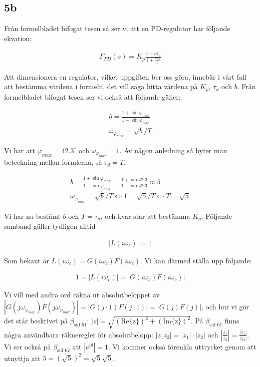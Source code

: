 \documentclass[a4paper]{article}
\newcommand{\mhb}[1]{$\beta_{\text{#1}}$}     %
\newcommand{\oklarhet}[1]{%
  \noindent\fbox{\parbox[b][2em][t]{\textwidth}{\color{red}#1} }%
}
\begin{document}
\subsection{5b}
Från formelbladet bifogat tesen så ser vi att en PD-regulator har följande ekvation:

\begin{align*}
  F_{PD}(s) = K_p \frac{1+s\tau_d}{1+\frac{s\tau_d}{b}}
\end{align*}

Att dimensionera en regulator, vilket uppgiften ber oss göra, innebär i vårt fall att bestämma värdena i formeln, det vill säga hitta värdena på $K_p$, $\tau_d$ och $b$. Från formelbladet bifogat tesen ser vi också att följande gäller:

\begin{align*}
  b = \frac{1 + \sin \varphi_{max}}{1 - \sin \varphi_{max}}\\
  \omega_{\varphi_{max}} = \sqrt{b}/T
\end{align*}

Vi har att $\varphi_{max} = 42.3^\circ$ och $\omega_{\varphi_{max}} = 1$. Av någon anledning så byter man beteckning mellan formlerna, så $\tau_d = T$.\\
\oklarhet{Varför är $T = \tau_d$?}

\begin{align*}
  b = \frac{1 + \sin \varphi_{max}}{1 - \sin \varphi_{max}} = \frac{1 + \sin 42.3}{1 - \sin 42.3} \approx 5\\
  \omega_{\varphi_{max}} = \sqrt{b}/T \Longleftrightarrow 1 = \sqrt{5}/T \Longleftrightarrow T = \sqrt{5}
\end{align*}

Vi har nu bestämt $b$ och $T = \tau_d$, och kvar står att bestämma $K_p$. Följande samband gäller tydligen alltid\\
\oklarhet{Referens?}

\begin{align*}
  |L(i\omega_c)| = 1
\end{align*}

Som bekant är $L(i\omega_c) = G(i\omega_c)F(i\omega_c)$. Vi kan därmed ställa upp följande:

\begin{align*}
  1 = |L(i\omega_c)| = |G(i\omega_c)F(i\omega_c)|
\end{align*}

Vi vill med andra ord räkna ut absolutbeloppet av $|G(j\omega_{\varphi_{max}})F(j\omega_{\varphi_{max}})| = |G(j\cdot1)F(j\cdot1)| = |G(j)F(j)|$, och hur vi gör det står beskrivet på \mhb{sid 61}: $|z| = \sqrt{(\text{Re\{z\}})^2 + (\text{Im\{z\}})^2}$. På \mhb{sid 61} finns några användbara räkneregler för absolutbelopp: $|z_1 z_2| = |z_1|\cdot |z_2|$ och $\left|\frac{z_1}{z_2}\right| = \frac{|z_1|}{|z_2|}$. Vi ser också på \mhb{sid 62} att $|e^{i\theta}| = 1$. Vi kommer också förenkla uttrycket genom att utnyttja att $5 = (\sqrt{5})^2 = \sqrt{5}\sqrt{5}$.
\end{document}
